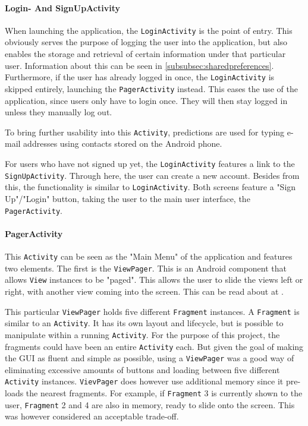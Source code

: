 \paragraph{Login- And SignUpActivity}
When launching the application, the \texttt{LoginActivity} is the point of entry. This obviously serves the purpose of logging the user into the application, but also enables the storage and retrieval of certain information under that particular user. Information about this can be seen in \ref{subsubsec:sharedpreferences}. Furthermore, if the user has already logged in once, the \texttt{LoginActivity} is skipped entirely, launching the \texttt{PagerActivity} instead. This eases the use of the application, since users only have to login once. They will then stay logged in unless they manually log out.

To bring further usability into this \texttt{Activity}, predictions are used for typing e-mail addresses using contacts stored on the Android phone.

For users who have not signed up yet, the \texttt{LoginActivity} features a link to the \texttt{SignUpActivity}. Through here, the user can create a new account. Besides from this, the functionality is similar to \texttt{LoginActivity}. Both screens feature a "Sign Up"/"Login" button, taking the user to the main user interface, the \texttt{PagerActivity}.

\paragraph{PagerActivity}
This \texttt{Activity} can be seen as the "Main Menu" of the application and features two elements. The first is the \texttt{ViewPager}. This is an Android component that allows \texttt{View} instances to be "paged". This allows the user to slide the views left or right, with another view coming into the screen. This can be read about at \citep{viewpager}.

This particular \texttt{ViewPager} holds five different \texttt{Fragment} instances. A \texttt{Fragment} is similar to an \texttt{Activity}. It has its own layout and lifecycle, but is possible to manipulate within a running \texttt{Activity}.\citep{fragment} For the purpose of this project, the fragments could have been an entire \texttt{Activity} each. But given the goal of making the GUI as fluent and simple as possible, using a \texttt{ViewPager} was a good way of eliminating excessive amounts of buttons and loading between five different \texttt{Activity} instances. \texttt{VievPager} does however use additional memory since it pre-loads the nearest fragments. For example, if \texttt{Fragment} 3 is currently shown to the user, \texttt{Fragment} 2 and 4 are also in memory, ready to slide onto the screen. This was however considered an acceptable trade-off.

